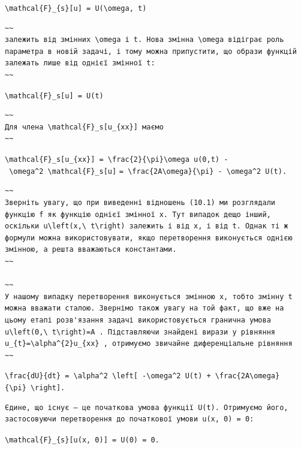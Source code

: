 \documentclass[
  ukrainian,
]{article}
\begin{document}
\texttt{\textbackslash{}mathcal\{F\}\_\{s\}{[}u{]}\ =\ U(\textbackslash{}omega,\ t)}

\begin{verbatim}
~~
залежить від змінних \omega і t. Нова змінна \omega відіграє роль параметра в новій задачі, і тому можна припустити, що образи функцій залежать лише від однієї змінної t:
~~
\end{verbatim}

\texttt{\textbackslash{}mathcal\{F\}\_s{[}u{]}\ =\ U(t)}

\begin{verbatim}
~~
Для члена \mathcal{F}_s[u_{xx}] маємо
~~
\end{verbatim}

\texttt{\textbackslash{}mathcal\{F\}\_s{[}u\_\{xx\}{]}\ =\ \textbackslash{}frac\{2\}\{\textbackslash{}pi\}\textbackslash{}omega\ u(0,t)\ -\ \textbackslash{}omega\^{}2\ \textbackslash{}mathcal\{F\}\_s{[}u{]}}
\texttt{=\ \textbackslash{}frac\{2A\textbackslash{}omega\}\{\textbackslash{}pi\}\ -\ \textbackslash{}omega\^{}2\ U(t).}

\begin{verbatim}
~~
Зверніть увагу, що при виведенні відношень (10.1) ми розглядали функцію f як функцію однієї змінної x. Тут випадок дещо інший, оскільки u\left(x,\ t\right) залежить і від x, і від t. Однак ті ж формули можна використовувати, якщо перетворення виконується однією змінною, а решта вважаються константами.
~~

~~
У нашому випадку перетворення виконується змінною x, тобто змінну t можна вважати сталою. Звернімо також увагу на той факт, що вже на цьому етапі розв'язання задачі використовується гранична умова u\left(0,\ t\right)=A . Підставляючи знайдені вирази у рівняння u_{t}=\alpha^{2}u_{xx} , отримуємо звичайне диференціальне рівняння
~~
\end{verbatim}

\texttt{\textbackslash{}frac\{dU\}\{dt\}\ =\ \textbackslash{}alpha\^{}2\ \textbackslash{}left{[}\ -\textbackslash{}omega\^{}2\ U(t)\ +\ \textbackslash{}frac\{2A\textbackslash{}omega\}\{\textbackslash{}pi\}\ \textbackslash{}right{]}.}

\begin{verbatim}
Єдине, що існує — це початкова умова функції U(t). Отримуємо його, застосовуючи перетворення до початкової умови u(x, 0) = 0:
\end{verbatim}

\texttt{\textbackslash{}mathcal\{F\}\_\{s\}{[}u(x,\ 0){]}\ =\ U(0)\ =\ 0.}
\end{document}
